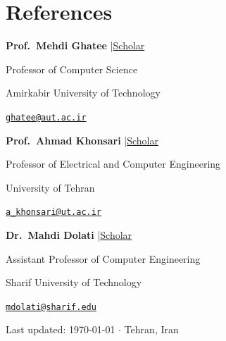 \documentclass[10pt,a4paper]{article}
\newlength{\refcardw}
\newcommand{\cvrefcard}[5]{%
    \begingroup
    \setlength{\refcardw}{\dimexpr\linewidth/3-4pt\relax}%
    \begin{minipage}[t]{\refcardw}
        \raggedright
        \textbf{\color{darkgray}#1}%
        \textcolor{rulecol}{\small\;|\;}\href{#2}{{\scriptsize\color{accent}Scholar}}\par
        \vspace{2pt}
        {\small\color{medgray}#3}\par
        {\small\color{lightgray}#4}\par
        \vspace{3pt}
        {\footnotesize\color{accent}\faEnvelope\;\href{mailto:#5}{\nolinkurl{#5}}}\par
    \end{minipage}%
    \endgroup
}
\begin{document}
\section{References}

\noindent
\cvrefcard{Prof.\ Mehdi Ghatee}{https://scholar.google.com/citations?user=b7lfEJwAAAAJ\&hl=en}%
          {Professor of Computer Science}%
          {Amirkabir University of Technology}%
          {ghatee@aut.ac.ir}%
\hfill
\cvrefcard{Prof.\ Ahmad Khonsari}{https://scholar.google.com/citations?user=Xfvk1SoAAAAJ\&hl=en}%
          {Professor of Electrical and Computer Engineering}%
          {University of Tehran}%
          {a_khonsari@ut.ac.ir}%
\hfill
\cvrefcard{Dr.\ Mahdi Dolati}{https://scholar.google.com/citations?user=b7A2CXYAAAAJ\&hl=en}%
          {Assistant Professor of Computer Engineering}%
          {Sharif University of Technology}%
          {mdolati@sharif.edu}
\par

\vfill
\begin{center}
    \small\color{lightgray}
    Last updated: \today
    \;\textcolor{dotcol}{$\cdot$}\;
    Tehran, Iran
\end{center}
\end{document}
